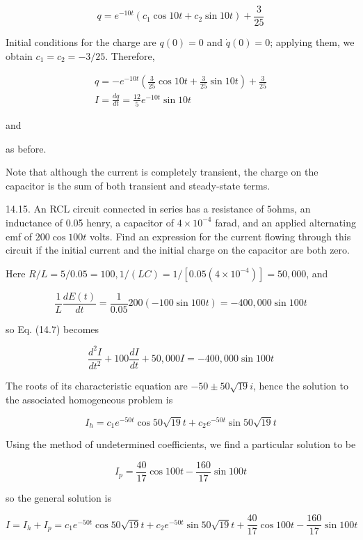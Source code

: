 \documentclass[10pt]{article}
\begin{document}
$$
q=e^{-10 t}\left(c_{1} \cos 10 t+c_{2} \sin 10 t\right)+\frac{3}{25}
$$

Initial conditions for the charge are $q(0)=0$ and $\dot{q}(0)=0$; applying them, we obtain $c_{1}=c_{2}=-3 / 25$. Therefore,

$$
\begin{gathered}
q=-e^{-10 t}\left(\frac{3}{25} \cos 10 t+\frac{3}{25} \sin 10 t\right)+\frac{3}{25} \\
I=\frac{d q}{d t}=\frac{12}{5} e^{-10 t} \sin 10 t
\end{gathered}
$$

and

as before.

Note that although the current is completely transient, the charge on the capacitor is the sum of both transient and steady-state terms.

14.15. An RCL circuit connected in series has a resistance of $5 \mathrm{ohms}$, an inductance of 0.05 henry, a capacitor of $4 \times 10^{-4}$ farad, and an applied alternating emf of $200 \cos 100 t$ volts. Find an expression for the current flowing through this circuit if the initial current and the initial charge on the capacitor are both zero.

Here $R / L=5 / 0.05=100,1 /(L C)=1 /\left[0.05\left(4 \times 10^{-4}\right)\right]=50,000$, and

$$
\frac{1}{L} \frac{d E(t)}{d t}=\frac{1}{0.05} 200(-100 \sin 100 t)=-400,000 \sin 100 t
$$

so Eq. (14.7) becomes

$$
\frac{d^{2} I}{d t^{2}}+100 \frac{d I}{d t}+50,000 I=-400,000 \sin 100 t
$$

The roots of its characteristic equation are $-50 \pm 50 \sqrt{19} i$, hence the solution to the associated homogeneous problem is

$$
I_{h}=c_{1} e^{-50 t} \cos 50 \sqrt{19} t+c_{2} e^{-50 t} \sin 50 \sqrt{19} t
$$

Using the method of undetermined coefficients, we find a particular solution to be

$$
I_{p}=\frac{40}{17} \cos 100 t-\frac{160}{17} \sin 100 t
$$

so the general solution is


\begin{equation*}
I=I_{h}+I_{p}=c_{1} e^{-50 t} \cos 50 \sqrt{19} t+c_{2} e^{-50 t} \sin 50 \sqrt{19} t+\frac{40}{17} \cos 100 t-\frac{160}{17} \sin 100 t \tag{1}
\end{equation*}
\end{document}
